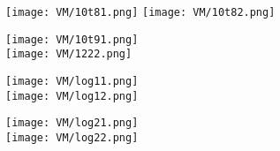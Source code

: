 

\begin{figure}[h]
		\centering
		\texttt{[image: VM/10t81.png]}
		\texttt{[image: VM/10t82.png]}
\label{ris:image}
\end{figure}



\begin{figure}[h]
		\centering
		\texttt{[image: VM/10t91.png]}
		\\
		\texttt{[image: VM/1222.png]}
\label{ris:image}
\end{figure}



\begin{figure}[h]
		\centering
		\texttt{[image: VM/log11.png]}
		\\
		\texttt{[image: VM/log12.png]}
\label{ris:image}
\end{figure}



\begin{figure}[h]
		\centering
		\texttt{[image: VM/log21.png]}
		\\
		\texttt{[image: VM/log22.png]}
\label{ris:image}
\end{figure}









